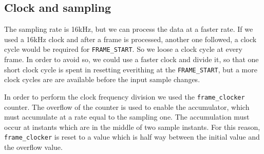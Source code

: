 
\subsection{Clock and sampling}
The sampling rate is 16\si{\kilo\hertz}, but we can process the data at a faster
rate. If we used a 16\si{\kilo\hertz} clock and after a frame is processed,
another one followed, a clock cycle would be required for \texttt{FRAME\_START}.
So we loose a clock cycle at every frame. In order to avoid so, we could use a
faster clock and divide it, so that one short clock cycle is spent in resetting
everithing at the \texttt{FRAME\_START}, but a more clock cycles are are
available before the input sample changes.

In order to perform the clock frequency division we used the
\texttt{frame_clocker} counter.
The overflow of the counter is used to enable the accumulator, which must
accumulate at a rate equal to the sampling one.
The accumulation must occur at instants which are in the middle of two sample
instants. For this reason, \texttt{frame_clocker} is reset to a value which is
half way between the initial value and the overflow value.
